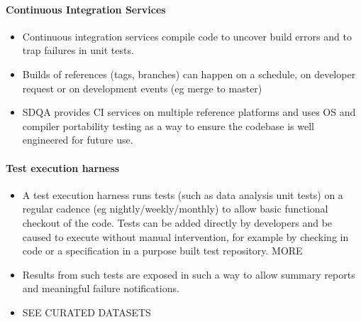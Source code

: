 \paragraph{Continuous Integration Services}
\label{sec:qaCI}
\begin{itemize}

\item Continuous integration services compile code to uncover build errors and to trap failures in unit tests.

\item Builds of references (tags, branches) can happen on a schedule, on developer request or on development events (eg merge to master)

\item SDQA provides CI services on multiple reference platforms and uses OS and compiler portability testing as a way to ensure the codebase is well engineered for future use.

\end{itemize}

\paragraph{Test execution harness}
\label{sec:qaTestharness}
\begin{itemize}

\item A test execution harness runs tests (such as data analysis unit tests) on a regular cadence (eg nightly/weekly/monthly) to allow basic functional checkout of the code. Tests can be added directly by developers and be caused to execute without manual intervention, for example by checking in code or a specification in a purpose built test repository.  MORE

\item Results from such tests are exposed in such a way to allow summary reports and meaningful failure notifications.

\item SEE CURATED DATASETS

\end{itemize}


